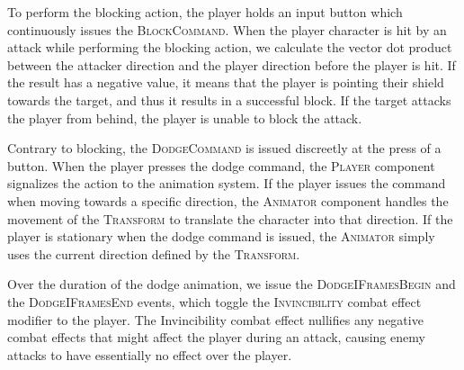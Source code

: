 To perform the blocking action, the player holds an input button which continuously issues the \textsc{BlockCommand}. When the player character is hit by an attack while performing the blocking action, we calculate the vector dot product between the attacker direction and the player direction before the player is hit. If the result has a negative value, it means that the player is pointing their shield towards the target, and thus it results in a successful block. If the target attacks the player from behind, the player is unable to block the attack.


Contrary to blocking, the \textsc{DodgeCommand} is issued discreetly at the press of a button. When the player presses the dodge command, the \textsc{Player} component signalizes the action to the animation system. If the player issues the command when moving towards a specific direction, the \textsc{Animator} component handles the movement of the \textsc{Transform} to translate the character into that direction. If the player is stationary when the dodge command is issued, the \textsc{Animator} simply uses the current direction defined by the \textsc{Transform}.

Over the duration of the dodge animation, we issue the \textsc{DodgeIFramesBegin} and the \textsc{DodgeIFramesEnd} events, which toggle the \textsc{Invincibility} combat effect modifier to the player. The Invincibility combat effect nullifies any negative combat effects that might affect the player during an attack, causing enemy attacks to have essentially no effect over the player.




